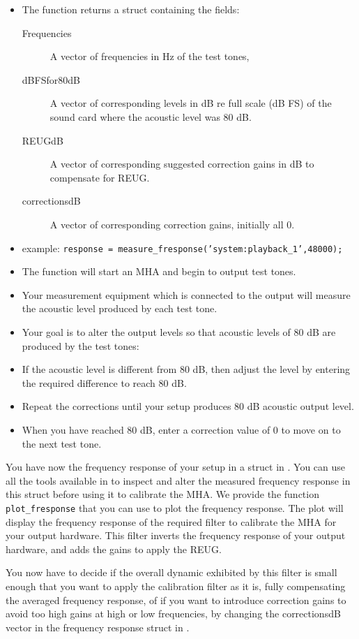 \documentclass[11pt,a4paper,twoside]{article}
\newcommand{\+}{\discretionary{\mbox{\scriptsize$\hookleftarrow$}}{}{}}
\begin{document}
\begin{itemize}
\begin{itemize}
  \item The function returns a struct containing the fields:
    \begin{description}
    \item [Frequencies] A vector of frequencies in Hz of the test tones,
    \item [dBFSfor80dB] A vector of corresponding levels in dB re full scale (dB FS) of the sound card where the acoustic level was 80 dB.
    \item [REUGdB] A vector of corresponding suggested correction gains in dB to compensate for REUG.
    \item [correctionsdB] A vector of corresponding correction gains, initially all 0.
    \end{description}
  \item
    example: \texttt{response = measure\_fresponse('system:playback\_1',48000);}
  \item
    The function will start an MHA and begin to output test tones.
  \item
    Your measurement equipment which is connected to the output will
    measure the acoustic level produced by each test tone.
  \item
    Your goal is to alter the output levels so that acoustic levels of
    80 dB are produced by the test tones:
  \item
    If the acoustic level is different from 80 dB, then adjust the level
    by entering the required difference to reach 80 dB.
  \item
    Repeat the corrections until your setup produces 80 dB acoustic
    output level.
  \item
    When you have reached 80 dB, enter a correction value of 0 to move
    on to the next test tone.
  \end{itemize}
\end{itemize}
  
You have now the frequency response of your setup in a struct in \Matlab{}.
%
You can use all the tools available in \Matlab{} to inspect and alter the
measured frequency response in this struct before using it to
calibrate the MHA.
%
We provide the \Matlab{} function \texttt{plot\_fresponse} that you can use
to plot the frequency response.
%
The plot will display the frequency response of the required filter to
calibrate the MHA for your output hardware.
%
This filter inverts the frequency response of your output hardware, and
adds the gains to apply the REUG.

You now have to decide if the overall dynamic exhibited by this filter
is small enough that you want to apply the calibration filter as it
is, fully compensating the averaged frequency response, of if you want
to introduce correction gains to avoid too high gains at high or low frequencies,
by changing the correctionsdB vector in the frequency response struct in \Matlab{}.
\end{document}
